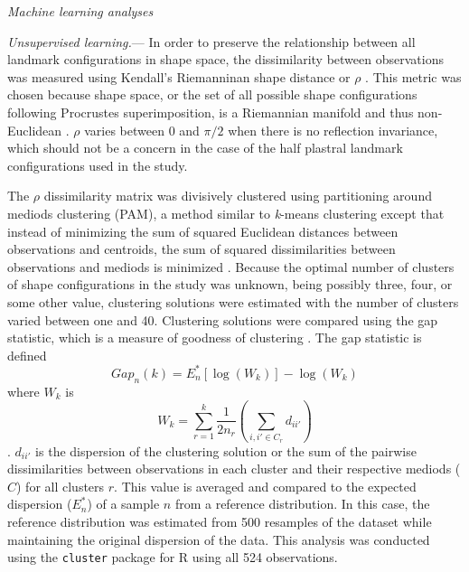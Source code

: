 \documentclass[12pt,letterpaper]{article}\usepackage{graphicx, color}
\renewcommand{\subsection}[1]{%
\bigskip
\begin{center}
\begin{large}
\normalfont\itshape #1
\end{large}
\end{center}}
\renewcommand{\subsubsection}[1]{%
\vspace{2ex}
\noindent
\textit{#1.}---}
\begin{document}
\subsection{Machine learning analyses}
\subsubsection{Unsupervised learning}
In order to preserve the relationship between all landmark configurations in shape space, the dissimilarity between observations was measured using Kendall's Riemanninan shape distance or \(\rho\) \citep{Kendall1984a,Dryden1998a}. This metric was chosen because shape space, or the set of all possible shape configurations following Procrustes superimposition, is a Riemannian manifold and thus non-Euclidean \citep{Dryden1998a}. \(\rho\) varies between 0 and \(\pi / 2\) when there is no reflection invariance, which should not be a concern in the case of the half plastral landmark configurations used in the study.

The \(\rho\) dissimilarity matrix was divisively clustered using partitioning around mediods clustering (PAM), a method similar to \textit{k}-means clustering except that instead of minimizing the sum of squared Euclidean distances between observations and centroids, the sum of squared dissimilarities between observations and mediods is minimized \citep{Kaufman1990}.
Because the optimal number of clusters of shape configurations in the study was unknown, being possibly three, four, or some other value, clustering solutions were estimated with the number of clusters varied between one and 40. Clustering solutions were compared using the gap statistic, which is a measure of goodness of clustering \citep{Tibshirani2001a}. The gap statistic is defined
\[Gap_{n}(k) = E^{*}_{n}[\log(W_{k})] - \log(W_{k})\] 
where \(W_{k}\) is
\[W_{k} = \sum^{k}_{r = 1}{\frac{1}{2n_{r}} (\sum_{i,i' \in C_{r}} d_{ii'})}\].
\(d_{ii'}\) is the dispersion of the clustering solution or the sum of the pairwise dissimilarities between observations in each cluster and their respective mediods (\(C\)) for all clusters \(r\). This value is averaged and compared to the expected dispersion (\(E^{*}_{n}\)) of a sample \(n\) from a reference distribution. In this case, the reference distribution was estimated from 500 resamples of the dataset while maintaining the original dispersion of the data.
This analysis was conducted using the \texttt{cluster} package for R \citep{Maechler2013} using all 524 observations.
\end{document}
